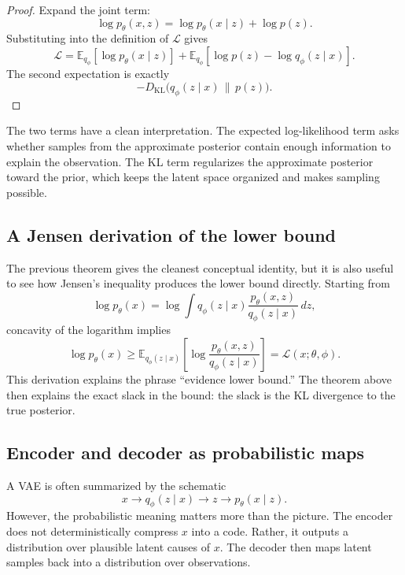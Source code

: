 \begin{proof}
Expand the joint term:
\[
\log p_\theta(x,z)=\log p_\theta(x\mid z)+\log p(z).
\]
Substituting into the definition of $\mathcal L$ gives
\[
\mathcal L
=
\mathbb E_{q_\phi}[\log p_\theta(x\mid z)]
+
\mathbb E_{q_\phi}[\log p(z)-\log q_\phi(z\mid x)].
\]
The second expectation is exactly
\[
- D_{\mathrm{KL}}\bigl(q_\phi(z\mid x)\,\|\,p(z)\bigr).
\]
\end{proof}

The two terms have a clean interpretation.
The expected log-likelihood term asks whether samples from the approximate posterior contain enough information to explain the observation.
The KL term regularizes the approximate posterior toward the prior, which keeps the latent space organized and makes sampling possible.

\subsection*{A Jensen derivation of the lower bound}

The previous theorem gives the cleanest conceptual identity, but it is also useful to see how Jensen's inequality produces the lower bound directly.
Starting from
\[
\log p_\theta(x)
=
\log \int q_\phi(z\mid x)\frac{p_\theta(x,z)}{q_\phi(z\mid x)}\,dz,
\]
concavity of the logarithm implies
\[
\log p_\theta(x)
\ge
\mathbb E_{q_\phi(z\mid x)}\left[\log \frac{p_\theta(x,z)}{q_\phi(z\mid x)}\right]
=
\mathcal L(x;\theta,\phi).
\]
This derivation explains the phrase ``evidence lower bound.''
The theorem above then explains the exact slack in the bound: the slack is the KL divergence to the true posterior.

\subsection*{Encoder and decoder as probabilistic maps}

A VAE is often summarized by the schematic
\[
x \longrightarrow q_\phi(z\mid x) \longrightarrow z \longrightarrow p_\theta(x\mid z).
\]
However, the probabilistic meaning matters more than the picture.
The encoder does not deterministically compress $x$ into a code.
Rather, it outputs a distribution over plausible latent causes of $x$.
The decoder then maps latent samples back into a distribution over observations.

